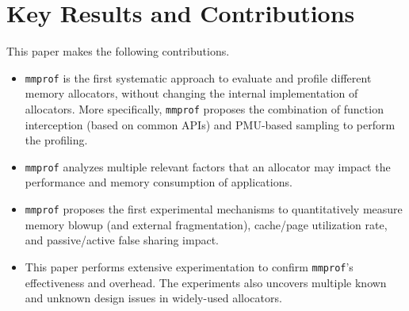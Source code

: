 \documentclass[pageno]{jpaper}
\newcommand{\MP}{\texttt{mmprof}}
\begin{document}

\section{Key Results and Contributions}
\label{sec:key-contributions}

This paper makes the following contributions. 

\begin{itemize}
\item \MP{} is the first systematic approach to evaluate and profile different memory allocators, without changing the internal implementation of allocators. More specifically, \MP{} proposes the combination of function interception (based on common APIs) and PMU-based sampling to perform the profiling.
 

\item \MP{} analyzes multiple relevant factors that an allocator may impact the performance and memory consumption of applications.


\item \MP{} proposes the first experimental mechanisms to quantitatively measure memory blowup (and external fragmentation), cache/page utilization rate, and passive/active false sharing impact. 

\item This paper performs extensive experimentation to confirm \MP{}'s effectiveness and overhead. The experiments also uncovers multiple known and unknown design issues in widely-used allocators.  

\end{itemize} 
\end{document}
